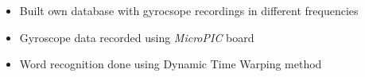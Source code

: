 \documentclass[10pt,a4paper]{altacv}
\begin{document}
\divider



\begin{itemize}
    \item \small{Built own database with gyrocsope recordings in different frequencies}
    \item \small{Gyroscope data recorded using \textit{MicroPIC} board}
    \item \small{Word recognition done using Dynamic Time Warping method}
    \\
    \smallskip
     
\end{itemize}
\end{document}
